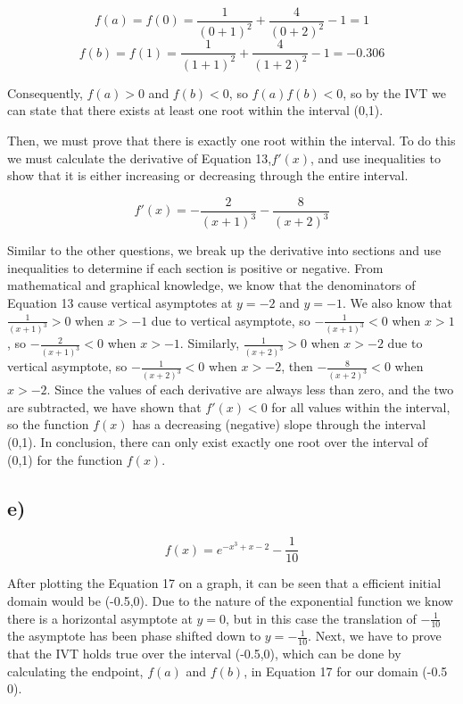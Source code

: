 \documentclass{article}
\begin{document}
    \begin{equation}
         f(a) = f(0) = \frac{1}{(0+1)^2} + \frac{4}{(0+2)^2} -1 = 1
    \end{equation}
    \begin{equation}
         f(b) = f(1) = \frac{1}{(1+1)^2} + \frac{4}{(1+2)^2} -1 = -0.306
    \end{equation}

    Consequently, $f(a) > 0$ and $f(b) < 0$, so $f(a)f(b) < 0$, so by the IVT we can state that there exists at least one root within the interval (0,1).
    
    Then, we must prove that there is exactly one root within the interval.  To do this we must calculate the derivative of Equation 13,$f'(x)$, and use inequalities to show that it is either increasing or decreasing through the entire interval.

    \begin{equation}
        f'(x) = -\frac{2}{(x+1)^3} - \frac{8}{(x+2)^3} 
    \end{equation}

    Similar to the other questions, we break up the derivative into sections and use inequalities to determine if each section is positive or negative.  From mathematical and graphical knowledge, we know that the denominators of Equation 13 cause vertical asymptotes at $y=-2$ and $y=-1$.  We also know that $\frac{1}{(x+1)^3} > 0$ when $x>-1$ due to vertical asymptote, so $-\frac{1}{(x+1)^3} < 0$ when $x>1$, so $-\frac{2}{(x+1)^3} < 0$ when $x>-1$.  Similarly, $\frac{1}{(x+2)^3} > 0$ when $x>-2$ due to vertical asymptote, so $-\frac{1}{(x+2)^3} < 0$ when $x>-2$, then $-\frac{8}{(x+2)^3} < 0$ when $x>-2$.  Since the values of each derivative are always less than zero, and the two are subtracted, we have shown that $f'(x) < 0$ for all values within the interval, so the function $f(x)$ has a decreasing (negative) slope through the interval (0,1).  In conclusion, there can only exist exactly one root over the interval of (0,1) for the function $ f(x)$.

\subsection*{e)}
    \begin{equation}
         f(x) = e^{-x^3+x-2}-\frac{1}{10}
    \end{equation}

    After plotting the Equation 17 on a graph, it can be seen that a efficient initial domain would be (-0.5,0).  Due to the nature of the exponential function we know there is a horizontal asymptote at $y=0$, but in this case the translation of $-\frac{1}{10}$ the asymptote has been phase shifted down to $y=-\frac{1}{10}$.  Next, we have to prove that the IVT holds true over the interval (-0.5,0), which can be done by calculating the endpoint, $f(a)$ and $f(b)$, in Equation 17 for our domain (-0.5 0).
\end{document}
